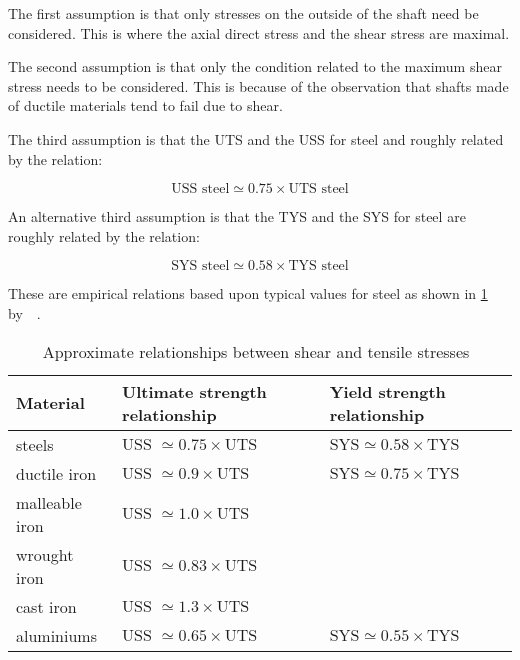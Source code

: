 The first assumption is that only stresses on the outside of the shaft need be considered. This is where the axial direct stress and the shear stress are maximal.

The second assumption is that only the condition related to the maximum shear stress needs to be considered. This is because of the observation that shafts made of ductile materials tend to fail due to shear.

The third assumption is that the \acf{UTS} and the \acf{USS} for steel and roughly related by the relation:

\begin{equation}
  \text{USS steel} \simeq 0.75 \times \text{UTS steel}
\end{equation}

An alternative third assumption is that the \acf{TYS} and the \acf{SYS} for steel are roughly related by the relation:

\begin{equation}
  \text{SYS steel} \simeq 0.58 \times \text{TYS steel}
\end{equation}

These are empirical relations based upon typical values for steel as shown in \cref{tbl-uts-relationships} by~\citet{deutschman1975}~\cite{deutschman1975}.

\begin{table}
  \caption[Approximate relationships between shear and tensile stresses]{Approximate relationships between shear and tensile stresses~\citep{deutschman1975}}
  \label{tbl-uts-relationships}
  \center{}
  \small
  \begin{tabular}{p{} p{} p{}}
    \toprule
    Material & Ultimate strength relationship & Yield strength relationship \\
    \midrule
    steels & \(\text{USS } \simeq 0.75 \times \text{UTS}\) & \(\text{SYS} \simeq 0.58 \times \text{TYS}\) \\
    ductile iron & \(\text{USS } \simeq 0.9 \times \text{UTS}\) & \(\text{SYS} \simeq 0.75 \times \text{TYS}\) \\
    malleable iron & \(\text{USS } \simeq 1.0 \times \text{UTS}\) &  \\
    wrought iron & \(\text{USS } \simeq 0.83 \times \text{UTS}\) &  \\
    cast iron & \(\text{USS } \simeq 1.3 \times \text{UTS}\) &  \\
    aluminiums & \(\text{USS } \simeq 0.65 \times \text{UTS}\) & \(\text{SYS} \simeq 0.55 \times \text{TYS}\) \\
    \bottomrule
  \end{tabular}
\end{table}

